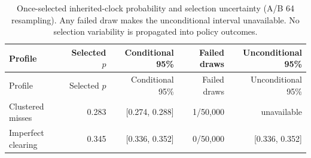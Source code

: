 \documentclass[11pt]{article}
\begin{document}
{\begin{longtable}{lrrrr}
\caption{Once-selected inherited-clock probability and selection uncertainty (A/B 64 resampling). Any failed draw makes the unconditional interval unavailable. No selection variability is propagated into policy outcomes.}\label{tab:clock-selection}\\
\toprule
Profile & Selected $p$ & Conditional 95\% & Failed draws & Unconditional 95\%\\\midrule\endfirsthead
Profile & Selected $p$ & Conditional 95\% & Failed draws & Unconditional 95\%\\\midrule\endhead
Clustered misses & 0.283 & [0.274, 0.288] & 1/50,000 & unavailable\\
Imperfect clearing & 0.345 & [0.336, 0.352] & 0/50,000 & [0.336, 0.352]\\
\bottomrule\end{longtable}

}
\end{document}
